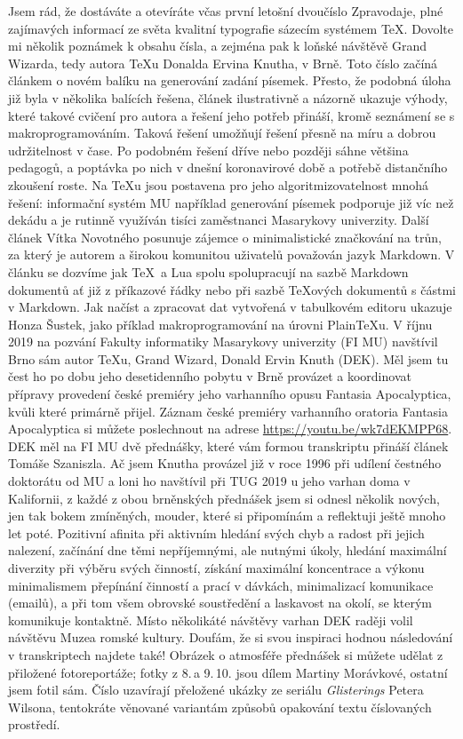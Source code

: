 Jsem rád, že dostáváte a otevíráte včas první letošní dvoučíslo Zpravodaje, plné zajímavých informací ze světa kvalitní typografie sázecím systémem \TeX.  Dovolte mi několik poznámek k obsahu čísla, a zejména pak k loňské návštěvě Grand Wizarda, tedy autora \TeX u Donalda Ervina Knutha, v Brně.
Toto číslo začíná článkem o novém balíku na generování zadání písemek.  Přesto, že podobná úloha již byla v několika balících řešena, článek ilustrativně a názorně ukazuje výhody, které takové cvičení pro autora a řešení jeho potřeb přináší, kromě seznámení se s makroprogramováním.  Taková řešení umožňují řešení přesně na míru a dobrou udržitelnost v čase. Po podobném řešení dříve nebo později sáhne většina pedagogů, a poptávka po nich v dnešní koronavirové době a potřebě distančního zkoušení roste. Na \TeX u jsou postavena pro jeho algoritmizovatelnost mnohá řešení: informační systém MU například generování písemek podporuje již víc než dekádu a je rutinně využíván tisíci zaměstnanci Masarykovy univerzity.
Další článek Vítka Novotného posunuje zájemce o minimalistické značkování na trůn, za který je autorem a širokou komunitou uživatelů považován jazyk Markdown. V článku se dozvíme jak \TeX\ a Lua spolu spolupracují na sazbě Markdown dokumentů ať již z příkazové řádky nebo při sazbě \TeX ových dokumentů s částmi v Markdown.
Jak načíst a zpracovat dat vytvořená v tabulkovém editoru ukazuje Honza Šustek, jako příklad makroprogramování na úrovni Plain\TeX u.
V říjnu 2019 na pozvání Fakulty informatiky Masarykovy univerzity (FI MU) navštívil Brno sám autor \TeX u, Grand Wizard, Donald Ervin Knuth (DEK).  Měl jsem tu čest ho po dobu jeho desetidenního pobytu v Brně provázet a koordinovat přípravy provedení české premiéry jeho varhanního opusu Fantasia Apocalyptica, kvůli které primárně přijel.
Záznam české premiéry varhanního oratoria Fantasia Apocalyptica si můžete poslechnout na adrese \url{https://youtu.be/wk7dEKMPP68}.
DEK měl na FI MU dvě přednášky, které vám formou transkriptu přináší článek Tomáše Szaniszla. Ač jsem Knutha provázel již v roce 1996 při udílení čestného doktorátu od MU a loni ho navštívil při TUG 2019 u jeho varhan doma v Kalifornii, z každé z obou brněnských přednášek jsem si odnesl několik nových, jen tak bokem zmíněných, mouder, které si připomínám a reflektuji ještě mnoho let poté.
Pozitivní afinita při aktivním hledání svých chyb a radost při jejich nalezení, začínání dne těmi nepříjemnými, ale nutnými úkoly, hledání maximální diverzity při výběru svých činností, získání maximální koncentrace a výkonu minimalismem přepínání činností a prací v dávkách, minimalizací komunikace (emailů), a při tom všem obrovské soustředění a laskavost na okolí, se kterým komunikuje kontaktně.
Místo několikáté návštěvy varhan DEK raději volil návštěvu Muzea romské kultury.
Doufám, že si svou inspiraci hodnou následování v transkriptech najdete také!  Obrázek o atmosféře přednášek si můžete udělat z přiložené fotoreportáže; fotky z 8.\,a 9.\,10. jsou dílem Martiny Morávkové, ostatní jsem fotil sám.
Číslo uzavírají přeložené ukázky ze seriálu \emph{Glisterings} Petera Wilsona, tentokráte věnované variantám způsobů opakování textu číslovaných prostředí.
